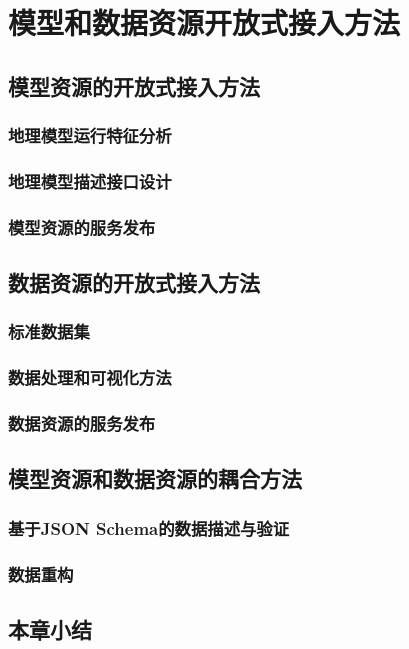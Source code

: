 \chapter{模型和数据资源开放式接入方法}

\section{模型资源的开放式接入方法}
\subsection{地理模型运行特征分析}
\subsection{地理模型描述接口设计}
\subsection{模型资源的服务发布}

\section{数据资源的开放式接入方法}
\subsection{标准数据集}
\subsection{数据处理和可视化方法}
\subsection{数据资源的服务发布}

\section{模型资源和数据资源的耦合方法}
\subsection{基于JSON Schema的数据描述与验证}
\subsection{数据重构}

\section{本章小结}
